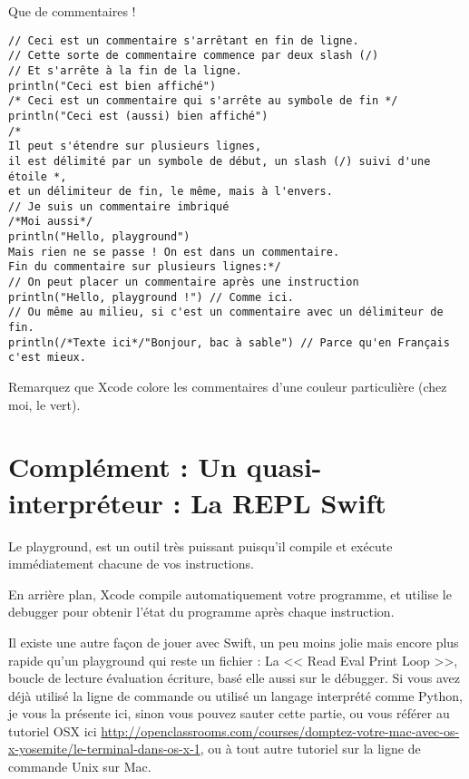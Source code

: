 \begin{listing}[h]
\caption{Que de commentaires !}
\begin{verbatim}
// Ceci est un commentaire s'arrêtant en fin de ligne.
// Cette sorte de commentaire commence par deux slash (/)
// Et s'arrête à la fin de la ligne.
println("Ceci est bien affiché")
/* Ceci est un commentaire qui s'arrête au symbole de fin */
println("Ceci est (aussi) bien affiché")
/*
Il peut s'étendre sur plusieurs lignes,
il est délimité par un symbole de début, un slash (/) suivi d'une étoile *,
et un délimiteur de fin, le même, mais à l'envers.
// Je suis un commentaire imbriqué
/*Moi aussi*/
println("Hello, playground")
Mais rien ne se passe ! On est dans un commentaire.
Fin du commentaire sur plusieurs lignes:*/
// On peut placer un commentaire après une instruction
println("Hello, playground !") // Comme ici.
// Ou même au milieu, si c'est un commentaire avec un délimiteur de fin.
println(/*Texte ici*/"Bonjour, bac à sable") // Parce qu'en Français c'est mieux.
\end{verbatim}
\end{listing}
Remarquez que Xcode colore les commentaires d'une couleur particulière (chez moi, le vert).

\section{Complément : Un quasi-interpréteur : La REPL Swift}
Le playground, est un outil très puissant
puisqu’il compile et exécute immédiatement
chacune de vos instructions.

En arrière plan, Xcode compile automatiquement votre programme,
et utilise le debugger pour obtenir l’état du programme après chaque instruction.

Il existe une autre façon de jouer avec Swift,
un peu moins jolie mais encore plus rapide qu’un playground
qui reste un fichier :
La << Read Eval Print Loop >>, boucle de lecture évaluation écriture,
basé elle aussi sur le débugger.
Si vous avez déjà utilisé la ligne de commande
ou utilisé un langage interprété comme Python,
je vous la présente ici, sinon vous pouvez sauter cette partie,
ou vous référer au tutoriel OSX ici \url{http://openclassrooms.com/courses/domptez-votre-mac-avec-os-x-yosemite/le-terminal-dans-os-x-1},
ou à tout autre tutoriel sur la ligne de commande Unix sur Mac.

